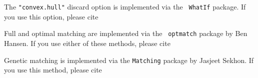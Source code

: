 The {\tt "convex.hull"} discard option is implemented via the {\tt
WhatIf} package.  If you use this option, please cite 
\begin{verse}
\end{verse} 

Full and optimal matching are implemented via the {\tt
optmatch} package by Ben Hansen. If you use either of these methods,
please cite
\begin{verse}
\end{verse} 

Genetic matching is implemented via the {\tt Matching} package by
Jasjeet Sekhon.  If you use this method, please cite
\begin{verse}
\end{verse}

